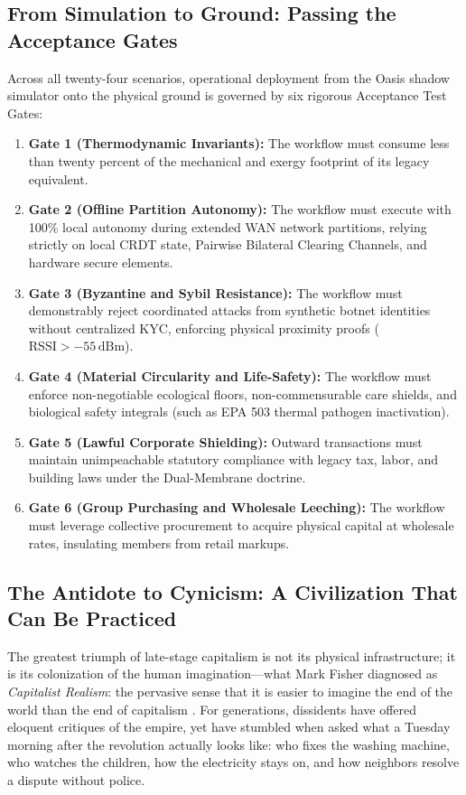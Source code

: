 \subsection{From Simulation to Ground: Passing the Acceptance Gates}
Across all twenty-four scenarios, operational deployment from the Oasis shadow simulator onto the physical ground is governed by six rigorous Acceptance Test Gates:
\begin{enumerate}
    \item \textbf{Gate 1 (Thermodynamic Invariants):} The workflow must consume less than twenty percent of the mechanical and exergy footprint of its legacy equivalent.
    \item \textbf{Gate 2 (Offline Partition Autonomy):} The workflow must execute with 100\% local autonomy during extended WAN network partitions, relying strictly on local CRDT state, Pairwise Bilateral Clearing Channels, and hardware secure elements.
    \item \textbf{Gate 3 (Byzantine and Sybil Resistance):} The workflow must demonstrably reject coordinated attacks from synthetic botnet identities without centralized KYC, enforcing physical proximity proofs ($\mathrm{RSSI} > -55\,\mathrm{dBm}$).
    \item \textbf{Gate 4 (Material Circularity and Life-Safety):} The workflow must enforce non-negotiable ecological floors, non-commensurable care shields, and biological safety integrals (such as EPA 503 thermal pathogen inactivation).
    \item \textbf{Gate 5 (Lawful Corporate Shielding):} Outward transactions must maintain unimpeachable statutory compliance with legacy tax, labor, and building laws under the Dual-Membrane doctrine.
    \item \textbf{Gate 6 (Group Purchasing and Wholesale Leeching):} The workflow must leverage collective procurement to acquire physical capital at wholesale rates, insulating members from retail markups.
\end{enumerate}

\subsection{The Antidote to Cynicism: A Civilization That Can Be Practiced}
The greatest triumph of late-stage capitalism is not its physical infrastructure; it is its colonization of the human imagination---what Mark Fisher diagnosed as \textit{Capitalist Realism}: the pervasive sense that it is easier to imagine the end of the world than the end of capitalism \parencite{fisher2009}. For generations, dissidents have offered eloquent critiques of the empire, yet have stumbled when asked what a Tuesday morning after the revolution actually looks like: who fixes the washing machine, who watches the children, how the electricity stays on, and how neighbors resolve a dispute without police.

